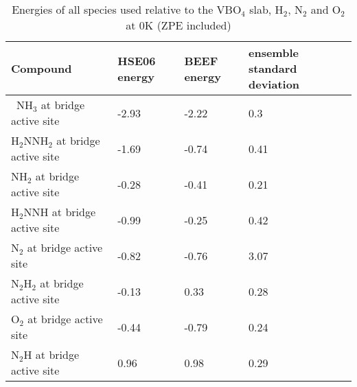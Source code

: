 \clearpage
\begin{center}
\renewcommand*{\arraystretch}{1.3}
\begin{longtable}{|m{5.8cm} |m{2.9cm}|m{2.9cm} |m{5.5cm} |} 
\caption{Energies of all species used relative to the VBO$_4$ slab, H$_2$, N$_2$ and O$_2$ at 0K (ZPE included)}
\label{tab:energies}
\endfirsthead
\endhead
\hline
Compound & HSE06 energy & BEEF energy  & ensemble standard deviation \\ \hline\ 
NH$_{3}$ at bridge active site&-2.93&-2.22&0.3\\  
H$_{2}$NNH$_{2}$ at bridge active site&-1.69&-0.74&0.41\\  
NH$_{2}$ at bridge active site&-0.28&-0.41&0.21\\  
H$_{2}$NNH at bridge active site&-0.99&-0.25&0.42\\  
N$_{2}$ at bridge active site&-0.82&-0.76&3.07\\  
N$_{2}$H$_{2}$ at bridge active site&-0.13&0.33&0.28\\  
O$_{2}$ at bridge active site&-0.44&-0.79&0.24\\  
N$_{2}$H at bridge active site&0.96&0.98&0.29\\  
 \hline \end{longtable}
\end{center}

